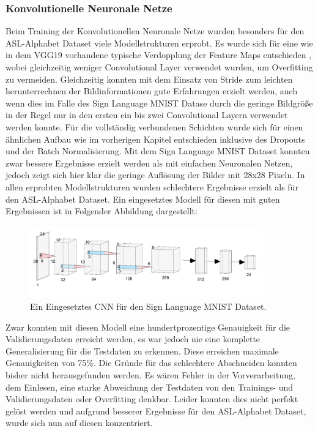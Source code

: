 \documentclass[11pt,bibliography=totocnumbered]{scrartcl}
\begin{document}
\subsubsection{Konvolutionelle Neuronale Netze}
Beim Training der Konvolutionellen Neuronale Netze wurden besonders für den ASL-Alphabet Dataset viele Modellstrukturen erprobt. Es wurde sich für eine wie in dem VGG19 vorhandene typische Verdopplung der Feature Maps entschieden \cite{VGG19}, wobei gleichzeitig weniger Convolutional Layer verwendet wurden, um Overfitting zu vermeiden. Gleichzeitig konnten mit dem Einsatz von Stride zum leichten herunterrechnen der Bildinformationen gute Erfahrungen erzielt werden, auch wenn dies im Falle des Sign Language MNIST Datase durch die geringe Bildgröße in der Regel nur in den ersten ein bis zwei Convolutional Layern verwendet werden konnte. Für die vollständig verbundenen Schichten wurde sich für einen ähnlichen Aufbau wie im vorherigen Kapitel entschieden inklusive des Dropouts und der Batch Normalisierung. Mit dem Sign Language MNIST Dataset konnten zwar bessere Ergebnisse erzielt werden als mit einfachen Neuronalen Netzen, jedoch zeigt sich hier klar die geringe Auflösung der Bilder mit 28x28 Pixeln. In allen erprobten Modellstrukturen wurden schlechtere Ergebnisse erzielt als für den ASL-Alphabet Dataset. Ein eingesetztes Modell für diesen mit guten Ergebnissen ist in Folgender Abbildung dargestellt:
\begin{figure}[H]
	\centering
	\includegraphics[width=0.90\textwidth]{cnn_example_kaggle_1}
	\vspace*{-3mm}
	\caption[Eingesetztes CNN für den Sign Language MNIST Dataset]{Ein Eingesetztes CNN für den Sign Language MNIST Dataset.}
	\label{fig:cnn_example_kaggle_1}
\end{figure}
\vspace*{-5mm}
Zwar konnten mit diesen Modell eine hundertprozentige Genauigkeit für die Validierungsdaten erreicht werden, es war jedoch nie eine komplette Generalisierung für die Testdaten zu erkennen. Diese erreichen maximale Genauigkeiten von 75\%. Die Gründe für das schlechtere Abschneiden konnten bisher nicht herausgefunden werden. Es wären Fehler in der Vorverarbeitung, dem Einlesen, eine starke Abweichung der Testdaten von den Trainings- und Validierungsdaten oder Overfitting denkbar. Leider konnten dies nicht perfekt gelöst werden und aufgrund besserer Ergebnisse für den ASL-Alphabet Dataset, wurde sich nun auf diesen konzentriert. 
\end{document}
